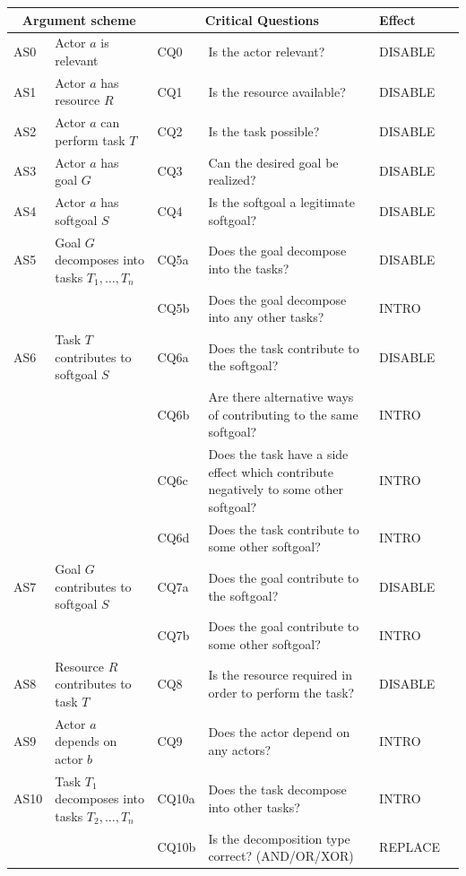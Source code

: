 \begin{table}[h]
\centering
\begin{tabularx}{\textwidth}{|l|l|l|X|l|l|}
\hline
\multicolumn{2}{|c|}{\textbf{Argument scheme}} & \multicolumn{2}{c|}{\textbf{Critical Questions}} & \textbf{Effect}\\
\hline
AS0 & Actor $a$ is relevant & CQ0 &Is the actor relevant? & DISABLE\\
\hline
AS1 & Actor $a$ has resource $R$ & CQ1 &Is the resource available? & DISABLE\\
\hline
AS2 & Actor $a$ can perform task $T$ & CQ2 &Is the task possible? & DISABLE\\
\hline
AS3 & Actor $a$ has goal $G$ & CQ3 & Can the desired goal be realized? & DISABLE\\
\hline
AS4 & Actor $a$ has softgoal $S$ & CQ4 & Is the softgoal a legitimate softgoal?& DISABLE\\
\hline
\hline
AS5 & Goal $G$ decomposes into tasks $T_1,\ldots,T_n$ & CQ5a & Does the goal decompose into the tasks?& DISABLE\\
& & CQ5b & Does the goal decompose into any other tasks?& INTRO\\
\hline
AS6 & Task $T$ contributes to softgoal $S$& CQ6a & Does the task contribute to the softgoal?& DISABLE\\
&& CQ6b & Are there alternative ways of contributing to the same softgoal?& INTRO \\
&& CQ6c & Does the task have a side effect which contribute negatively to some other softgoal?& INTRO\\
&& CQ6d & Does the task contribute to some other softgoal?& INTRO\\
\hline
AS7 & Goal $G$ contributes to softgoal $S$ & CQ7a & Does the goal contribute to the softgoal?& DISABLE\\
&& CQ7b & Does the goal contribute to some other softgoal?& INTRO\\
\hline
AS8 & Resource $R$ contributes to task $T$ & CQ8 & Is the resource required in order to perform the task?& DISABLE\\
\hline
AS9 & Actor $a$ depends on actor $b$ & CQ9 & Does the actor depend on any actors?& INTRO\\
\hline
AS10 & Task $T_1$ decomposes into tasks $T_2,\ldots,T_n$ & CQ10a & Does the task decompose into other tasks?& INTRO\\
 &  & CQ10b & Is the decomposition type correct? (AND/OR/XOR)& REPLACE\\
\hline

\end{tabularx}
\end{table}
